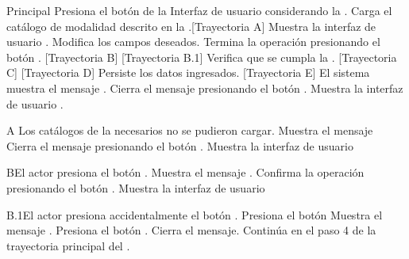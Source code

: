 \begin{UCtrayectoria}{Principal}
	\UCpaso[\UCactor] Presiona el botón de la Interfaz de usuario  considerando la  .
	\UCpaso Carga el catálogo de modalidad descrito en la .[Trayectoria A]
	\UCpaso Muestra la interfaz de usuario .
	\UCpaso[\UCactor] Modifica los campos deseados.
	\UCpaso[\UCactor] Termina la operación presionando el botón . [Trayectoria B] [Trayectoria B.1]
	\UCpaso Verifica que se cumpla la . [Trayectoria C] [Trayectoria D]
	\UCpaso Persiste los datos ingresados. [Trayectoria E]
	\UCpaso El sistema muestra el mensaje .
	\UCpaso[\UCactor] Cierra el mensaje presionando el botón .
	\UCpaso Muestra la interfaz de usuario .
\end{UCtrayectoria}
\begin{UCtrayectoriaA}{A}{ Los catálogos de la  necesarios no se pudieron cargar.}
    \UCpaso Muestra el mensaje 
    \UCpaso[\UCactor] Cierra el mensaje presionando el botón .
    \UCpaso Muestra la interfaz de usuario 
\end{UCtrayectoriaA}

\begin{UCtrayectoriaA}{B}{El actor presiona el botón .}
	\UCpaso Muestra el mensaje .
	\UCpaso[\UCactor] Confirma la operación presionando el botón .
	\UCpaso Muestra la interfaz de usuario 
\end{UCtrayectoriaA}

\begin{UCtrayectoriaA}{B.1}{El actor presiona accidentalmente el botón .}
	\UCpaso[\UCactor] Presiona el botón 
	\UCpaso Muestra el mensaje .
	\UCpaso[\UCactor] Presiona el botón .
	\UCpaso Cierra el mensaje.
	\UCpaso Continúa en el paso 4 de la trayectoria principal del .
\end{UCtrayectoriaA}

